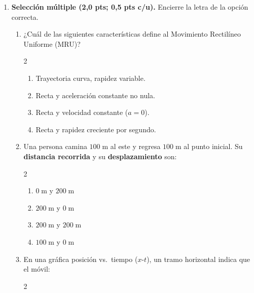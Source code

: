 \documentclass[12pt, letterpaper]{article}
\begin{document}
\begin{enumerate}[leftmargin=*, label=\textbf{\arabic*.}, itemsep=0.2em]

  \item \textbf{Selección múltiple (2,0 pts; 0,5 pts c/u).} Encierre la letra de la opción correcta.
        \setlength{\multicolsep}{2pt}
        \begin{enumerate}[label=\alph*), leftmargin=1.8em, itemsep=0.14em]
          \item ¿Cuál de las siguientes características define al Movimiento Rectilíneo Uniforme (MRU)?
                \begin{multicols}{2}
                  \begin{enumerate}[label=\Alph*), leftmargin=1.5em, nosep]
                    \item Trayectoria curva, rapidez variable.
                    \item Recta y aceleración constante no nula.
                    \item Recta y velocidad constante ($a = 0$).
                    \item Recta y rapidez creciente por segundo.
                  \end{enumerate}
                \end{multicols}
          \item Una persona camina $100\;\text{m}$ al este y regresa $100\;\text{m}$ al punto inicial. Su \textbf{distancia recorrida} y su \textbf{desplazamiento} son:
                \begin{multicols}{2}
                  \begin{enumerate}[label=\Alph*), leftmargin=1.5em, nosep]
                    \item $0\;\text{m}$ y $200\;\text{m}$
                    \item $200\;\text{m}$ y $0\;\text{m}$
                    \item $200\;\text{m}$ y $200\;\text{m}$
                    \item $100\;\text{m}$ y $0\;\text{m}$
                  \end{enumerate}
                \end{multicols}
          \item En una gráfica posición vs.\ tiempo ($x$-$t$), un tramo horizontal indica que el móvil:
                \begin{multicols}{2}
                  \begin{enumerate}[label=\Alph*), leftmargin=1.5em, nosep]

\end{enumerate}
\end{multicols}
\end{enumerate}
\end{enumerate}
\end{document}
